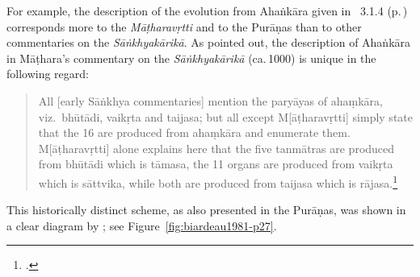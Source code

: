 For example, the description of the evolution from Ahaṅkāra given in  \SS\
3.1.4 (p.\,\pageref{3.1.4}) corresponds more to the
\textit{Māṭharavṛtti} and to the Purāṇas than to other
commentaries on the \emph{Sāṅkhyakārikā}.  As \citeauthor{solo-1974}
pointed out, the description of Ahaṅkāra in Māṭhara's commentary on the
\emph{Sāṅkhyakārikā} (ca.\,1000) is unique in the following regard:
\begin{quote}
    All [early Sāṅkhya commentaries]
    mention the paryāyas of ahaṃkāra, viz.\ bhūtādi, vaikṛta
    and taijasa; but all except M[āṭharavṛtti] simply state that the 16
    are produced from ahaṃkāra and enumerate them. M[āṭharavṛtti] 
    alone explains here that the five tanmātras are produced
    from bhūtādi which is tāmasa, the 11 organs are
    produced from vaikṛta which is sāttvika, while both
    are produced from taijasa which is rājasa.\footcite[52, 180]{solo-1974}     
\end{quote}
 This historically distinct scheme, as also presented in the Purāṇas,
was shown in a clear diagram by \citet[27]{biar-1981}; see
Figure~\ref{fig:biardeau1981-p27}.
